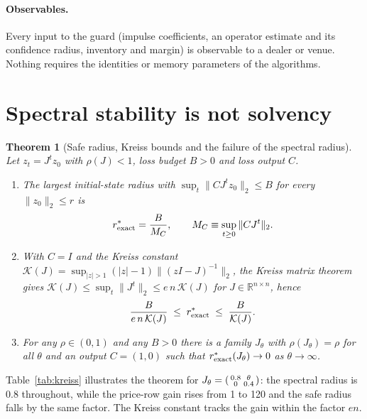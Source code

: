 \documentclass[12pt]{article}
\newtheorem{theorem}{Theorem}[section]
\theoremstyle{definition}
\theoremstyle{remark}
\newcommand{\R}{\mathbb{R}}
\begin{document}
\paragraph{Observables.} Every input to the guard (impulse coefficients, an operator estimate and its confidence radius, inventory and margin) is observable to a dealer or venue. Nothing requires the identities or memory parameters of the algorithms.

\section{Spectral stability is not solvency}\label{sec:radius}

\begin{theorem}[Safe radius, Kreiss bounds and the failure of the spectral radius]\label{thm:radius}
Let $z_t=J^tz_0$ with $\rho(J)<1$, loss budget $B>0$ and loss output $C$.
\begin{enumerate}[label=(\roman*)]
\item The largest initial-state radius with $\sup_t\|CJ^tz_0\|_2\le B$ for every $\|z_0\|_2\le r$ is
\begin{equation}\label{eq:rexact}
r^*_{\rm exact}=\frac{B}{M_C},\qquad M_C\equiv\sup_{t\ge0}\|CJ^t\|_2 .
\end{equation}
\item With $C=I$ and the Kreiss constant $\mathcal K(J)=\sup_{|z|>1}(|z|-1)\|(zI-J)^{-1}\|_2$, the Kreiss matrix theorem gives $\mathcal K(J)\le\sup_t\|J^t\|_2\le e\,n\,\mathcal K(J)$ for $J\in\R^{n\times n}$, hence
\begin{equation}\label{eq:kreiss}
\frac{B}{e\,n\,\mathcal K(J)}\;\le\;r^*_{\rm exact}\;\le\;\frac{B}{\mathcal K(J)} .
\end{equation}
\item For any $\rho\in(0,1)$ and any $B>0$ there is a family $J_\theta$ with $\rho(J_\theta)=\rho$ for all $\theta$ and an output $C=(1,0)$ such that $r^*_{\rm exact}(J_\theta)\to0$ as $\theta\to\infty$.
\end{enumerate}
\end{theorem}

Table~\ref{tab:kreiss} illustrates the theorem for $J_\theta=\begin{psmallmatrix}0.8&\theta\\0&0.4\end{psmallmatrix}$: the spectral radius is $0.8$ throughout, while the price-row gain rises from 1 to 120 and the safe radius falls by the same factor. The Kreiss constant tracks the gain within the factor $en$.
\end{document}
